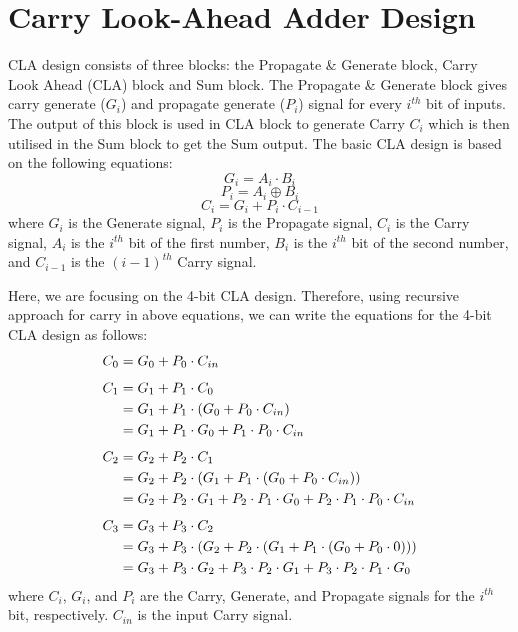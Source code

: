 \documentclass[conference]{IEEEtran}
\begin{document}
\section{Carry Look-Ahead Adder Design}
\noindent
CLA design consists of three blocks: the Propagate \& Generate block, Carry Look Ahead (CLA) block and Sum block. The Propagate \& Generate block gives carry generate ($G_i$) and propagate generate ($P_i$) signal for every $i^{th}$ bit of inputs. The output of this block is used in CLA block to generate Carry $C_i$ which is then utilised in the Sum block to get the Sum output. The basic CLA design is based on the following equations:
\begin{equation}
G_i = A_i \cdot B_i
\end{equation}
\begin{equation}
P_i = A_i \oplus B_i
\end{equation}
\begin{equation}
C_i = G_i + P_i \cdot C_{i-1}
\end{equation}
where $G_i$ is the Generate signal, $P_i$ is the Propagate signal, $C_i$ is the Carry signal, $A_i$ is the $i^{th}$ bit of the first number, $B_i$ is the $i^{th}$ bit of the second number, and $C_{i-1}$ is the $(i-1)^{th}$ Carry signal.

Here, we are focusing on the 4-bit CLA design. Therefore, using recursive approach for carry in above equations, we can write the equations for the 4-bit CLA design as follows:
\begin{align}
    C_0 &= G_0 + P_0 \cdot C_{in} \label{eq:basicc0} \\[1ex]
    C_1 &= G_1 + P_1 \cdot C_0 \notag \\
        &= G_1 + P_1 \cdot (G_0 + P_0 \cdot C_{in}) \notag \\
        &= G_1 + P_1 \cdot G_0 + P_1 \cdot P_0 \cdot C_{in} \label{eq:basicc1} \\[1ex]
    C_2 &= G_2 + P_2 \cdot C_1 \notag \\
        &= G_2 + P_2 \cdot (G_1 + P_1 \cdot (G_0 + P_0 \cdot C_{in})) \notag \\
        &= G_2 + P_2 \cdot G_1 + P_2 \cdot P_1 \cdot G_0 + P_2 \cdot P_1 \cdot P_0 \cdot C_{in} \label{eq:basicc2} \\[1ex]
    C_3 &= G_3 + P_3 \cdot C_2 \notag \\
        &= G_3 + P_3 \cdot (G_2 + P_2 \cdot (G_1 + P_1 \cdot (G_0 + P_0 \cdot 0))) \notag \\
        &= G_3 + P_3 \cdot G_2 + P_3 \cdot P_2 \cdot G_1 + P_3 \cdot P_2 \cdot P_1 \cdot G_0 \label{eq:basicc3}
    \end{align}
where $C_i$, $G_i$, and $P_i$ are the Carry, Generate, and Propagate signals for the $i^{th}$ bit, respectively. $C_{in}$ is the input Carry signal.
\end{document}
